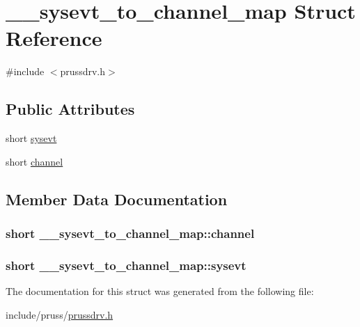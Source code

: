 \hypertarget{struct____sysevt__to__channel__map}{\section{\-\_\-\-\_\-sysevt\-\_\-to\-\_\-channel\-\_\-map Struct Reference}
\label{struct____sysevt__to__channel__map}
}


{\ttfamily \#include $<$prussdrv.\-h$>$}

\subsection*{Public Attributes}
\begin{DoxyCompactItemize}
\item 
short \hyperlink{struct____sysevt__to__channel__map_a5e77be482e90c245ccceee02e636fcfa}{sysevt}
\item 
short \hyperlink{struct____sysevt__to__channel__map_a1f3378ae547bef32f0117071e64d8312}{channel}
\end{DoxyCompactItemize}


\subsection{Member Data Documentation}
\hypertarget{struct____sysevt__to__channel__map_a1f3378ae547bef32f0117071e64d8312}{
\subsubsection[{channel}]{\setlength{\rightskip}{0pt plus 5cm}short \-\_\-\-\_\-sysevt\-\_\-to\-\_\-channel\-\_\-map\-::channel}}\label{struct____sysevt__to__channel__map_a1f3378ae547bef32f0117071e64d8312}
\hypertarget{struct____sysevt__to__channel__map_a5e77be482e90c245ccceee02e636fcfa}{
\subsubsection[{sysevt}]{\setlength{\rightskip}{0pt plus 5cm}short \-\_\-\-\_\-sysevt\-\_\-to\-\_\-channel\-\_\-map\-::sysevt}}\label{struct____sysevt__to__channel__map_a5e77be482e90c245ccceee02e636fcfa}


The documentation for this struct was generated from the following file\-:\begin{DoxyCompactItemize}
\item 
include/pruss/\hyperlink{prussdrv_8h}{prussdrv.\-h}\end{DoxyCompactItemize}
